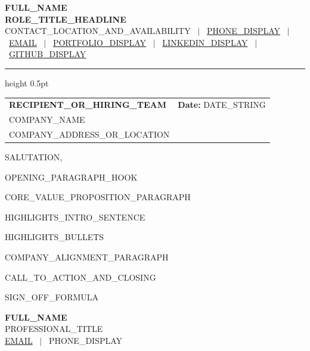 \documentclass[letterpaper,10pt]{article}
\begin{document}
\begin{center}
    {\LARGE \textbf{\scshape {{FULL_NAME}}}} \\ \vspace{2pt}
    {\small \textbf{\color{NavyBlue} {{ROLE_TITLE_HEADLINE}}}} \\ \vspace{2pt}
    \footnotesize 
    {{CONTACT_LOCATION_AND_AVAILABILITY}} \ $|$ \ 
    \href{tel:{{PHONE_RAW}}}{{{PHONE_DISPLAY}}} \ $|$ \ 
    \href{mailto:{{EMAIL}}}{{{EMAIL}}} \ $|$ \ 
    \href{{{PORTFOLIO_URL}}}{{{PORTFOLIO_DISPLAY}}} \ $|$ \ 
    \href{{{LINKEDIN_URL}}}{{{LINKEDIN_DISPLAY}}} \ $|$ \ 
    \href{{{GITHUB_URL}}}{{{GITHUB_DISPLAY}}}
\end{center}

\vspace{-4pt}
\hrule height 0.5pt \relax
\vspace{10pt}

\begin{tabularx}{\linewidth}{X r}
  \textbf{{{RECIPIENT_OR_HIRING_TEAM}}} & \textbf{Date:} {{DATE_STRING}} \\
  {{COMPANY_NAME}} & \\
  {{COMPANY_ADDRESS_OR_LOCATION}} & \\
\end{tabularx}

\vspace{10pt}

\textbf{}

\vspace{8pt}

{{SALUTATION}},

\vspace{5pt}
{{OPENING_PARAGRAPH_HOOK}}

\vspace{5pt}
{{CORE_VALUE_PROPOSITION_PARAGRAPH}}

\vspace{5pt}
{{HIGHLIGHTS_INTRO_SENTENCE}}
\begin{itemize}[leftmargin=0.15in, itemsep=1.5pt, topsep=2pt, parsep=0pt]
{{HIGHLIGHTS_BULLETS}}
\end{itemize}

\vspace{5pt}
{{COMPANY_ALIGNMENT_PARAGRAPH}}

\vspace{5pt}
{{CALL_TO_ACTION_AND_CLOSING}}

\vspace{12pt}

{{SIGN_OFF_FORMULA}}

\vspace{4pt}
\textbf{{{FULL_NAME}}} \\
\small{{{PROFESSIONAL_TITLE}}} \\
\footnotesize{\href{mailto:{{EMAIL}}}{{{EMAIL}}} \ $|$ \ {{PHONE_DISPLAY}}}
\end{document}
